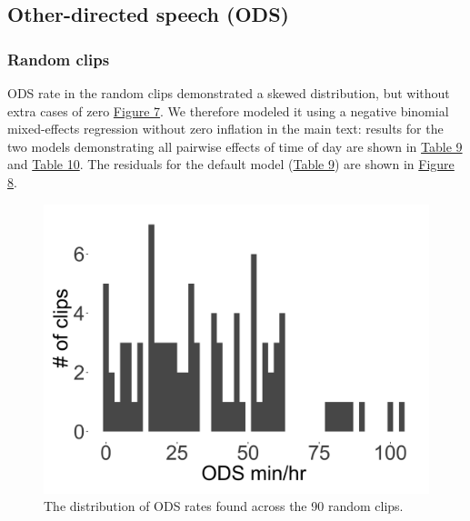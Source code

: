 \documentclass[,man,floatsintext]{apa6}
\begin{document}
\FloatBarrier

\subsection{Other-directed speech (ODS)}\label{models-ods}

\subsubsection{Random clips}\label{models-ods-random}

ODS rate in the random clips demonstrated a skewed distribution, but
without extra cases of zero \protect\hyperlink{fig7}{Figure 7}. We
therefore modeled it using a negative binomial mixed-effects regression
without zero inflation in the main text: results for the two models
demonstrating all pairwise effects of time of day are shown in
\protect\hyperlink{tab9}{Table 9} and \protect\hyperlink{tab10}{Table
10}. The residuals for the default model (\protect\hyperlink{tab9}{Table
9}) are shown in \protect\hyperlink{fig8}{Figure 8}.

\FloatBarrier

\begin{figure}[H]

{\centering \includegraphics[width=0.4\linewidth]{www/ODS_random_distribution} 

}

\caption{The distribution of ODS rates found across the 90 random clips.}\label{fig:fig7}
\end{figure}

\FloatBarrier
\end{document}
